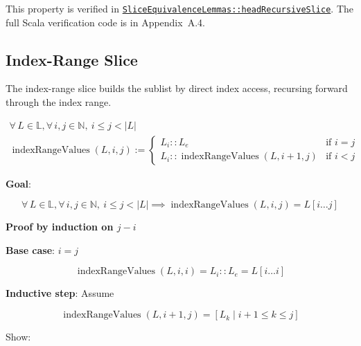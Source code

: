{\raggedright
This property is verified in
\href{https://github.com/thiagomata/prime-numbers/blob/list-article-v1.0.0/src/main/scala/v1/chapter3/list/properties/SliceEquivalenceLemmas.scala}{\texttt{SliceEquivalenceLemmas::\allowbreak headRecursiveSlice}}.
The full Scala verification code is in Appendix~A.4.
\par}

\subsection{Index-Range Slice}

The index-range slice builds the sublist by direct index access,
recursing forward through the index range.

\begin{gather*}
\forall\, L \in \mathbb{L}, \forall\, i, j \in \mathbb{N},\ i \leq j < |L| \\
\operatorname{indexRangeValues}(L, i, j) :=
\begin{cases}
L_i :: L_e & \text{if } i = j \\
L_i :: \operatorname{indexRangeValues}(L, i + 1, j) & \text{if } i < j
\end{cases}
\end{gather*}

\textbf{Goal}:\par\nopagebreak

\begin{equation*}
\forall\, L \in \mathbb{L}, \forall\, i, j \in \mathbb{N},\ i \leq j < |L| \implies \operatorname{indexRangeValues}(L, i, j) = L[i \dots j]
\end{equation*}

\textbf{Proof by induction on $j - i$}\par\nopagebreak

\textbf{Base case}: $i = j$\par\nopagebreak

\begin{equation*}
\operatorname{indexRangeValues}(L, i, i) = L_i :: L_e = L[i \dots i]
\end{equation*}

\textbf{Inductive step}: Assume\par\nopagebreak

\begin{equation*}
\operatorname{indexRangeValues}(L, i + 1, j) = [ L_k \mid i + 1 \leq k \leq j ]
\end{equation*}

Show:\par\nopagebreak

